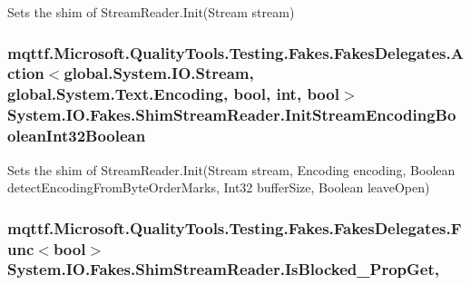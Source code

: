 Sets the shim of Stream\-Reader.\-Init(\-Stream stream)

\hypertarget{class_system_1_1_i_o_1_1_fakes_1_1_shim_stream_reader_a3462592ccfa539086973de1ea6dfb1bb}{
\subsubsection[{Init\-Stream\-Encoding\-Boolean\-Int32\-Boolean}]{\setlength{\rightskip}{0pt plus 5cm}mqttf.\-Microsoft.\-Quality\-Tools.\-Testing.\-Fakes.\-Fakes\-Delegates.\-Action$<$global.\-System.\-I\-O.\-Stream, global.\-System.\-Text.\-Encoding, bool, int, bool$>$ System.\-I\-O.\-Fakes.\-Shim\-Stream\-Reader.\-Init\-Stream\-Encoding\-Boolean\-Int32\-Boolean\hspace{0.3cm}{\ttfamily [set]}}}\label{class_system_1_1_i_o_1_1_fakes_1_1_shim_stream_reader_a3462592ccfa539086973de1ea6dfb1bb}


Sets the shim of Stream\-Reader.\-Init(\-Stream stream, Encoding encoding, Boolean detect\-Encoding\-From\-Byte\-Order\-Marks, Int32 buffer\-Size, Boolean leave\-Open)

\hypertarget{class_system_1_1_i_o_1_1_fakes_1_1_shim_stream_reader_aab103fdb005cc6b2e53c0ea18dc590c5}{
\subsubsection[{Is\-Blocked\-\_\-\-Prop\-Get}]{\setlength{\rightskip}{0pt plus 5cm}mqttf.\-Microsoft.\-Quality\-Tools.\-Testing.\-Fakes.\-Fakes\-Delegates.\-Func$<$bool$>$ System.\-I\-O.\-Fakes.\-Shim\-Stream\-Reader.\-Is\-Blocked\-\_\-\-Prop\-Get\hspace{0.3cm}{\ttfamily [get]}, {\ttfamily [set]}}}\label{class_system_1_1_i_o_1_1_fakes_1_1_shim_stream_reader_aab103fdb005cc6b2e53c0ea18dc590c5}


